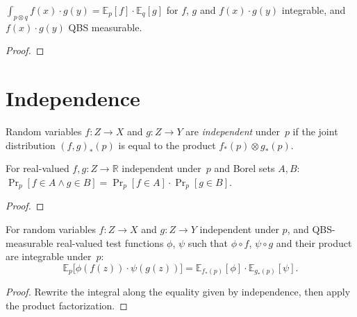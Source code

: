 \begin{lemma}\label{lem:qbs_pair_integral_factorization}
  \rocqok
  $\int_{p \otimes q} f(x) \cdot g(y)
  = \mathbb{E}_p[f] \cdot \mathbb{E}_q[g]$ for $f$, $g$ and $f(x) \cdot g(y)$
  integrable, and $f(x) \cdot g(y)$ QBS measurable.
\end{lemma}
\begin{proof}\rocqok\end{proof}


\section{Independence}\label{sec:independence}

\begin{definition}\label{def:indep}
  \rocqok
  Random variables $f : Z \to X$ and $g : Z \to Y$ are \emph{independent}
  under~$p$ if the joint distribution $(f, g)_*(p)$ is equal to the
  product $f_*(p) \otimes g_*(p)$.
\end{definition}

\begin{lemma}\label{lem:indep_rect}
  \rocqok
  For real-valued $f, g : Z \to \mathbb{R}$ independent under~$p$ and
  Borel sets $A, B$:
  $\Pr_p[f \in A \wedge g \in B] = \Pr_p[f \in A] \cdot \Pr_p[g \in B]$.
\end{lemma}
\begin{proof}\rocqok\end{proof}

\begin{lemma}\label{lem:qbs_integral_indep_factorization}
  \rocqok
  For random variables $f : Z \to X$ and $g : Z \to Y$ independent
  under $p$, and QBS-measurable real-valued test functions $\phi$, $\psi$
  such that $\phi \circ f$, $\psi \circ g$ and their product are
  integrable under~$p$:
  \[
    \mathbb{E}_p\bigl[\phi(f(z)) \cdot \psi(g(z))\bigr]
    = \mathbb{E}_{f_*(p)}[\phi] \cdot \mathbb{E}_{g_*(p)}[\psi].
  \]
\end{lemma}
\begin{proof}\rocqok
  Rewrite the integral along the equality given by independence,
  then apply the product factorization.
\end{proof}


